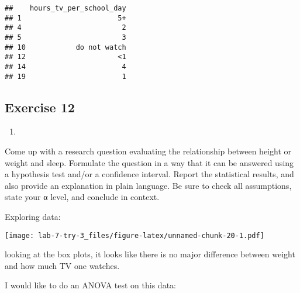 \documentclass[
]{article}
\newenvironment{Shaded}{\begin{snugshade}}{\end{snugshade}}
\newcommand{\DataTypeTok}[1]{\textcolor[rgb]{0.13,0.29,0.53}{#1}}
\newcommand{\KeywordTok}[1]{\textcolor[rgb]{0.13,0.29,0.53}{\textbf{#1}}}
\newcommand{\NormalTok}[1]{#1}
\newcommand{\OperatorTok}[1]{\textcolor[rgb]{0.81,0.36,0.00}{\textbf{#1}}}
\newcommand{\StringTok}[1]{\textcolor[rgb]{0.31,0.60,0.02}{#1}}
\begin{document}
\begin{verbatim}
##    hours_tv_per_school_day
## 1                       5+
## 4                        2
## 5                        3
## 10            do not watch
## 12                      <1
## 14                       4
## 19                       1
\end{verbatim}

\hypertarget{exercise-12}{%
\subsection{Exercise 12}\label{exercise-12}}

\begin{enumerate}
\def\labelenumi{\arabic{enumi}.}
\item
\end{enumerate}

Come up with a research question evaluating the relationship between
height or weight and sleep. Formulate the question in a way that it can
be answered using a hypothesis test and/or a confidence interval. Report
the statistical results, and also provide an explanation in plain
language. Be sure to check all assumptions, state your α level, and
conclude in context.

Exploring data:

\begin{Shaded}
\end{Shaded}

\texttt{[image: lab-7-try-3\_files/figure-latex/unnamed-chunk-20-1.pdf]}

looking at the box plots, it looks like there is no major difference
between weight and how much TV one watches.

I would like to do an ANOVA test on this data:
\end{document}
